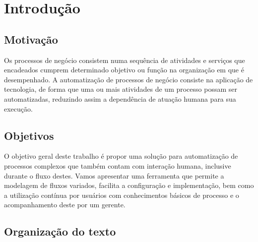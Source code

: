 \chapter{Introdução}\label{chp:introducao}

\section{Motivação}\label{sec:introducao-motivacao}
Os processos de negócio consistem numa sequência de atividades e serviços que  encadeados cumprem determinado objetivo ou função na organização em que é desempenhado. A automatização de processos de negócio consiste na aplicação de tecnologia, de forma que uma ou mais atividades de um processo possam ser automatizadas, reduzindo assim a dependência de atuação humana para sua execução.

\section{Objetivos}\label{sec:introducao-objetivo}
O objetivo geral deste trabalho é propor uma solução para automatização de processos complexos que também contam com interação humana, inclusive durante o fluxo destes. Vamos apresentar uma ferramenta que permite a modelagem de fluxos variados, facilita a configuração e implementação, bem como a utilização contínua por usuários com conhecimentos básicos de processo e o acompanhamento deste por um gerente.

\section{Organização do texto}\label{sec:introducao-organizacao_texto}